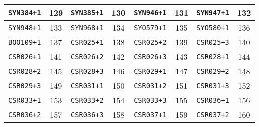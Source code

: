 \documentclass[./main.tex]{subfiles}
\begin{document}
\begin{table}[H]
\begin{tabularx}{\textwidth}{|c|c|c|c|c|c|c|c|}
\hline
\texttt{SYN384+1} & 129 & \texttt{SYN385+1} & 130 & \texttt{SYN946+1} & 131 & \texttt{SYN947+1} & 132\\
\hline
\texttt{SYN948+1} & 133 & \texttt{SYN968+1} & 134 & \texttt{SYO579+1} & 135 & \texttt{SYO580+1} & 136\\
\hline
\texttt{BOO109+1} & 137 & \texttt{CSR025+1} & 138 & \texttt{CSR025+2} & 139 & \texttt{CSR025+3} & 140\\
\hline
\texttt{CSR026+1} & 141 & \texttt{CSR026+2} & 142 & \texttt{CSR026+3} & 143 & \texttt{CSR028+1} & 144\\
\hline
\texttt{CSR028+2} & 145 & \texttt{CSR028+3} & 146 & \texttt{CSR029+1} & 147 & \texttt{CSR029+2} & 148\\
\hline
\texttt{CSR029+3} & 149 & \texttt{CSR031+1} & 150 & \texttt{CSR031+2} & 151 & \texttt{CSR031+3} & 152\\
\hline
\texttt{CSR033+1} & 153 & \texttt{CSR033+2} & 154 & \texttt{CSR033+3} & 155 & \texttt{CSR036+1} & 156\\
\hline
\texttt{CSR036+2} & 157 & \texttt{CSR036+3} & 158 & \texttt{CSR037+1} & 159 & \texttt{CSR037+2} & 160\\
\hline
\end{tabularx}
\end{table}
\end{document}
